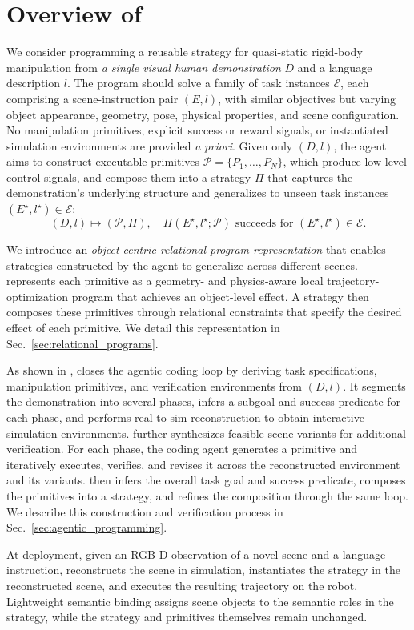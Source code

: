 \section{Overview of \ours}
\label{sec:overview}

We consider programming a reusable strategy for quasi-static rigid-body manipulation from \textit{a single visual human demonstration} $D$ and a language description $l$. The program should solve a family of task instances $\mathcal{E}$, each comprising a scene-instruction pair $(E,l)$, with similar objectives but varying object appearance, geometry, pose, physical properties, and scene configuration. No manipulation primitives, explicit success or reward signals, or instantiated simulation environments are provided \textit{a priori}. Given only $(D,l)$, the agent aims to construct executable primitives $\mathcal{P}=\{P_1,\ldots,P_N\}$, which produce low-level control signals, and compose them into a strategy $\Pi$ that captures the demonstration's underlying structure and generalizes to unseen task instances $(E^\star,l^\star)\in\mathcal{E}$:
\[
(D,l)
\mapsto
(\mathcal{P},\Pi),
\quad
\Pi(E^\star, l^\star;\mathcal{P}) \text{ succeeds for } (E^\star, l^\star) \in \mathcal{E}.
\]

We introduce an \textit{object-centric relational program representation} that enables strategies constructed by the agent to generalize across different scenes. \ours represents each primitive as a geometry- and physics-aware local trajectory-optimization program that achieves an object-level effect. A strategy then composes these primitives through relational constraints that specify the desired effect of each primitive. We detail this representation in Sec.~\ref{sec:relational_programs}.

As shown in , \ours closes the agentic coding loop by deriving task specifications, manipulation primitives, and verification environments from $(D,l)$. It segments the demonstration into several phases, infers a subgoal and success predicate for each phase, and performs real-to-sim reconstruction to obtain interactive simulation environments. \ours further synthesizes feasible scene variants for additional verification. For each phase, the coding agent generates a primitive and iteratively executes, verifies, and revises it across the reconstructed environment and its variants. \ours then infers the overall task goal and success predicate, composes the primitives into a strategy, and refines the composition through the same loop. We describe this construction and verification process in Sec.~\ref{sec:agentic_programming}.

At deployment, given an RGB-D observation of a novel scene and a language instruction, \ours reconstructs the scene in simulation, instantiates the strategy in the reconstructed scene, and executes the resulting trajectory on the robot. Lightweight semantic binding assigns scene objects to the semantic roles in the strategy, while the strategy and primitives themselves remain unchanged.